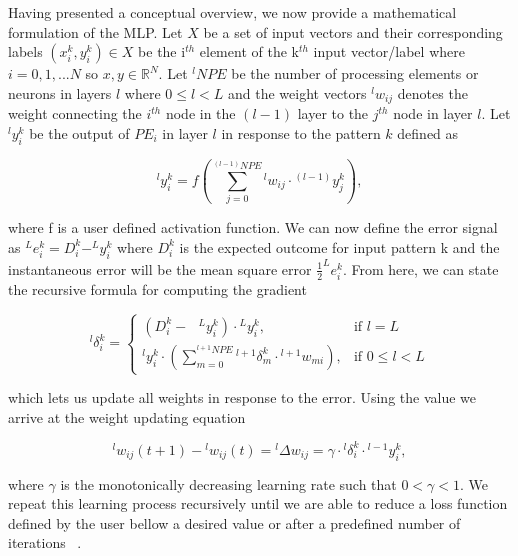 \documentclass[12pt]{article}
\begin{document}
Having presented a conceptual overview, we now provide a mathematical formulation of the MLP. Let $X$ be a set of input vectors and their corresponding labels $(x_i^k, y^k_i) \in X$ be the i$^{th}$ element of the k$^{th}$ input vector/label where $i=0,1, ... N$ so $x, y \in \mathbb{R}^N$. Let $^{l}NPE$ be the number of processing elements or neurons in layers $l$ where $0 \leq l < L$ and the weight vectors ${}^lw_{ij}$ denotes the weight connecting the $i^{th}$ node in the $(l-1)$ layer to the $j^{th}$ node in layer $l$. Let $^ly^k_i$ be the output of $PE_i$ in layer $l$ in response to the pattern $k$ defined as 

\begin{equation}
    {}^ly^{k}_i = f\left(\sum_{j=0}^{{}^{(l-1)}NPE} {}^lw_{ij} \cdot {}^{(l-1)}y^{k}_j\right),
\end{equation}

where f is a user defined activation function. We can now define the error signal as $^Le^k_i=D^k_i - ^Ly^k_i$ where $D^k_i$ is the expected outcome for input pattern k and the instantaneous error will be the mean square error $\frac{1}{2}^Le^k_i$. From here, we can state the recursive formula for computing the gradient 

\begin{equation}
^l\delta^k_i = 
\begin{cases}(D^k_i - \text{ } {}^{L}y^{k}_{i})  \cdot {}^{L}y^k_i, & \text{if } l = L  \\
{}^{l}y^k_i \cdot(\sum_{m=0}^{^{l+1}NPE} {}^{l+1}\delta^k_m \cdot{}^{l+1}w_{mi}), & \text{if } 0 \le l < L 
\end{cases}
\end{equation}

which lets us update all weights in response to the error. Using the value we arrive at the weight updating equation

\begin{equation}  
    {}^l w_{ij}(t+1) - {}^l w_{ij}(t) = {}^l \Delta w_{ij} = \gamma \cdot {}^l\delta^k_i \cdot {}^{l-1}y^k_i,
\end{equation}

where $\gamma$ is the monotonically decreasing learning rate such that $0 < \gamma < 1$. We repeat this learning process recursively until we are able to reduce a loss function defined by the user bellow a desired value or after a predefined number of iterations ~\cite{Rumelhart1986Backprop}.
\end{document}
